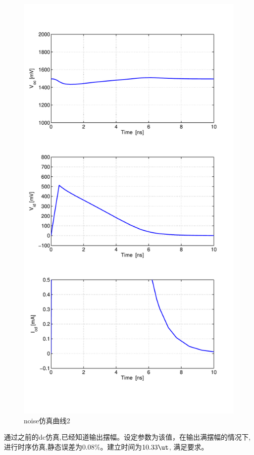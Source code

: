 \documentclass[a4paper]{article}
\begin{document}
\begin{figure}[htb]
    \begin{center}
        \includegraphics[width=\textwidth]{common/tran2.pdf}
    \end{center}
    \caption{noise仿真曲线2}
    \label{commontran2}
\end{figure}
通过之前的dc仿真,已经知道输出摆幅。设定参数为该值，在输出满摆幅的情况下,进行时序仿真,静态误差为$0.08\%$。建立时间为$10.33\ut$,
满足要求。
\newpage
\end{document}
